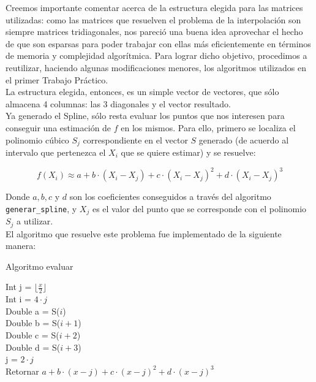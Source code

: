 \documentclass[a4paper]{article}
\begin{document}
Creemos importante comentar acerca de la estructura elegida para las matrices utilizadas: como las matrices que resuelven el problema de la interpolación son siempre matrices tridiagonales, nos pareció una buena idea aprovechar el hecho de que son esparsas para poder trabajar con ellas más eficientemente en términos de memoria y complejidad algorítmica. Para lograr dicho objetivo, procedimos a reutilizar, haciendo algunas modificaciones menores, los algoritmos utilizados en el primer Trabajo Práctico.\\
\indent La estructura elegida, entonces, es un simple vector de vectores, que sólo almacena 4 columnas: las 3 diagonales y el vector resultado. \\

Ya generado el Spline, sólo resta evaluar los puntos que nos interesen para conseguir una estimación de $f$ en los mismos. Para ello, primero se localiza el polinomio cúbico $S_j$ correspondiente en el vector $S$ generado (de acuerdo al intervalo que pertenezca el $X_i$ que se quiere estimar) y se resuelve:

\[f(X_i) \approx a+b\cdot (X_i - X_j)+c \cdot (X_i - X_j)^{2} + d \cdot (X_i - X_j)^{3}\]

\bigskip
Donde $a, b, c$ y $d$ son los coeficientes conseguidos a través del algoritmo \texttt{generar_spline}, y $X_j$ es el valor del punto que se corresponde con el polinomio $S_j$ a utilizar. \\
\indent El algoritmo que resuelve este problema fue implementado de la siguiente manera:

\IncMargin{1em}
\begin{algorithm}[h!]
\NoCaptionOfAlgo
\caption{Algoritmo evaluar}

\bigskip

Int j = $\lfloor \frac{x}{2} \rfloor$ \\
Int i = $4 \cdot j$ \\
\bigskip
Double a = S($i$)\\
Double b = S($i+1$)\\
Double c = S($i+2$)\\
Double d = S($i+3$)\\
\bigskip
j = $2 \cdot j$\\
\bigskip
Retornar $a+b\cdot (x - j)+c \cdot (x - j)^{2} + d \cdot (x - j)^{3}$
\end{algorithm}\DecMargin{1em}
\end{document}

